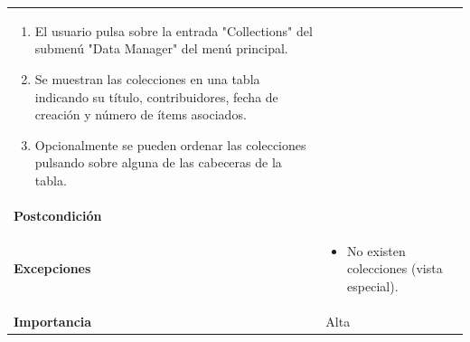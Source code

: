 \documentclass[
]{article}
\providecommand{\tightlist}{%
  \setlength{\itemsep}{0pt}\setlength{\parskip}{0pt}}
\begin{document}
\begin{longtable}[]{@{}ll@{}}
\begin{minipage}[t]{0.78\columnwidth}
\begin{enumerate}
\def\labelenumi{\arabic{enumi}.}
\tightlist
\item
  El usuario pulsa sobre la entrada "Collections" del submenú "Data
  Manager" del menú principal.
\item
  Se muestran las colecciones en una tabla indicando su título,
  contribuidores, fecha de creación y número de ítems asociados.
\item
  Opcionalmente se pueden ordenar las colecciones pulsando sobre alguna
  de las cabeceras de la tabla.
\end{enumerate}\strut
\end{minipage}\tabularnewline
\begin{minipage}[t]{0.16\columnwidth}\raggedright
\textbf{Postcondición}\strut
\end{minipage} & \begin{minipage}[t]{0.78\columnwidth}\raggedright
\strut
\end{minipage}\tabularnewline
\begin{minipage}[t]{0.16\columnwidth}\raggedright
\textbf{Excepciones}\strut
\end{minipage} & \begin{minipage}[t]{0.78\columnwidth}\raggedright
\begin{itemize}
\tightlist
\item
  No existen colecciones (vista especial).
\end{itemize}\strut
\end{minipage}\tabularnewline
\begin{minipage}[t]{0.16\columnwidth}\raggedright
\textbf{Importancia}\strut
\end{minipage} & \begin{minipage}[t]{0.78\columnwidth}\raggedright
Alta\strut
\end{minipage}\tabularnewline
\bottomrule
\end{longtable}
\end{document}
